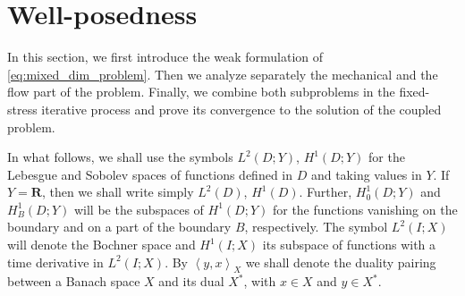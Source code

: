 \documentclass[a4paper]{article}
\numberwithin{equation}{section}
\def\dual#1#2{\left\langle #1,#2\right\rangle}
\def\Real{{\mathbf R}} %
\begin{document}
\section{Well-posedness}\label{sec:well_pos}

In this section, we first introduce the weak formulation of \eqref{eq:mixed_dim_problem}.
Then we analyze separately the mechanical and the flow part of the problem.
Finally, we combine both subproblems in the fixed-stress iterative process and prove its convergence to the solution of the coupled problem.

In what follows, we shall use the symbols $L^2(D;Y)$, $H^1(D;Y)$ for the Lebesgue and Sobolev spaces of functions defined in $D$ and taking values in $Y$.
If $Y=\Real$, then we shall write simply $L^2(D)$, $H^1(D)$.
Further, $H^1_0(D;Y)$ and $H^1_B(D;Y)$ will be the subspaces of $H^1(D;Y)$ for the functions vanishing on the boundary and on a part of the boundary $B$, respectively.
The symbol $L^2( I;X)$ will denote the Bochner space and $H^1( I;X)$ its subspace of functions with a time derivative in $L^2( I;X)$.
By $\dual{y}{x}_X$ we shall denote the duality pairing between a Banach space $X$ and its dual $X^*$, with $x\in X$ and $y\in X^*$.
\end{document}
